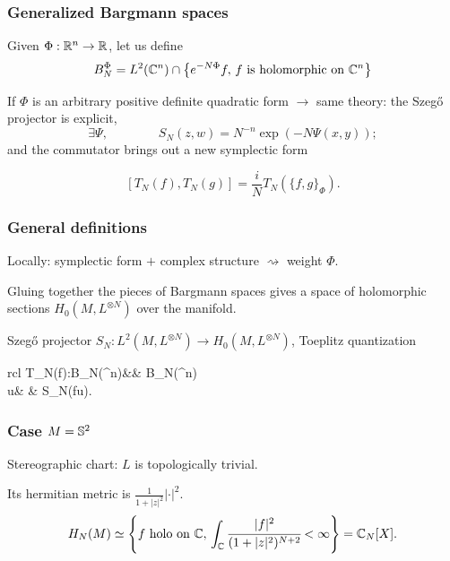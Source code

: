 \documentclass[mathserif]{beamer}
\begin{document}
\begin{frame}
 \frametitle{Generalized Bargmann spaces}
 Given $\Phi:\R^n\to \R$, let us define
    \[
     B_N^{\Phi}=L^2(\C^n)\cap\left\{e^{-N\Phi}f,\,f\text{ is
  holomorphic on $\C^n$}\right\}
    \]
    \vfill
    
    If $\Phi$ is an arbitrary positive definite quadratic form $\rightarrow$ same theory: 
    the Szeg\H{o} projector is explicit,
    \[
     \exists \Psi, \qquad \qquad S_N(z,w)=N^{-n}\exp(-N\Psi(x,y));
    \]
    and the commutator brings out a new symplectic form

    \[
     [T_N(f),T_N(g)]=\frac{i}{N}T_N(\{f,g\}_\Phi).
    \]
\end{frame}

\begin{frame}
 \frametitle{General definitions}
    Locally: symplectic form $+$ complex structure $\rightsquigarrow$ weight $\Phi$.
    
    \vfill
    
    Gluing together the pieces of Bargmann spaces gives a {\color{myorange} space of holomorphic sections} $H_0(M,L^{\otimes N})$ over the manifold.
    
    \vfill
    
    Szeg\H{o} projector $S_N:L^2(M,L^{\otimes N})\to H_0(M,L^{\otimes N})$, Toeplitz quantization
    \begin{center}
\begin{array}{rcl}
 		T_N(f):B_N(\C^n)&\to & B_N(\C^n)\\
		u& \mapsto& S_N(fu).
 		\end{array}
\end{center}
\end{frame}

\begin{frame}
  \frametitle{Case $M=\S^2$}
  Stereographic chart: $L$ is topologically trivial.

  \hspace{9.5em}Its hermitian metric is
  $\frac{1}{1+|z|^2}|\cdot|^2.$ \[H_N(M)\simeq \left\{f\text{ holo on $
        \C$},\,\int_{\C}\cfrac{|f|^2}{(1+|z|^2)^{N+2}}<\infty\right\}=\C_N[X].\]
\end{frame}
\end{document}
